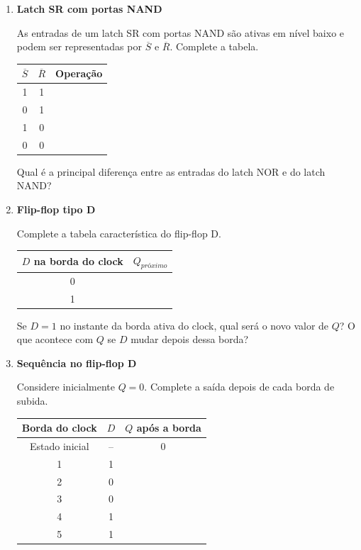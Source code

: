\documentclass[a4paper,12pt]{article}
\begin{document}
\begin{enumerate}[leftmargin=0.8cm,label=\textbf{\arabic*.},itemsep=0.65cm]
\item \textbf{Latch SR com portas NAND}

As entradas de um latch SR com portas NAND são ativas em nível baixo e podem
ser representadas por $\overline{S}$ e $\overline{R}$. Complete a tabela.

\begin{center}
\renewcommand{\arraystretch}{1.5}
\begin{tabular}{|c|c|c|}
\hline
$\overline{S}$ & $\overline{R}$ & \textbf{Operação} \\
\hline
1 & 1 & \\
\hline
0 & 1 & \\
\hline
1 & 0 & \\
\hline
0 & 0 & \\
\hline
\end{tabular}
\end{center}

Qual é a principal diferença entre as entradas do latch NOR e do latch NAND?

\vspace{1cm}

\newpage

\item \textbf{Flip-flop tipo D}

Complete a tabela característica do flip-flop D.

\begin{center}
\renewcommand{\arraystretch}{1.5}
\begin{tabular}{|c|c|}
\hline
$D$ na borda do clock & $Q_{próximo}$ \\
\hline
0 & \\
\hline
1 & \\
\hline
\end{tabular}
\end{center}

Se $D=1$ no instante da borda ativa do clock, qual será o novo valor de $Q$?
O que acontece com $Q$ se $D$ mudar depois dessa borda?

\vspace{1.2cm}

\item \textbf{Sequência no flip-flop D}

Considere inicialmente $Q=0$. Complete a saída depois de cada borda de subida.

\begin{center}
\renewcommand{\arraystretch}{1.5}
\begin{tabular}{|c|c|c|}
\hline
\textbf{Borda do clock} & $D$ & $Q$ após a borda \\
\hline
Estado inicial & -- & 0 \\
\hline
1 & 1 & \\
\hline
2 & 0 & \\
\hline
3 & 0 & \\
\hline
4 & 1 & \\
\hline
5 & 1 & \\
\hline
\end{tabular}
\end{center}


\end{enumerate}
\end{document}
